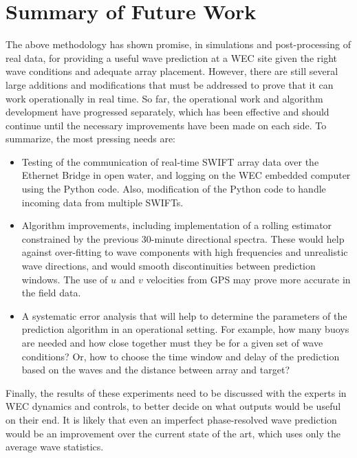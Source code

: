 \documentclass[11pt]{article}
\begin{document}
\section{Summary of Future Work}
The above methodology has shown promise, in simulations and post-processing of real data, for providing a useful wave prediction at a WEC site given the right wave conditions and adequate array placement.  However, there are still several large additions and modifications that must be addressed to prove that it can work operationally in real time.  So far, the operational work and algorithm development have progressed separately, which has been effective and should continue until the necessary improvements have been made on each side.  To summarize, the most pressing needs are:
\begin{itemize}
\item{Testing of the communication of real-time SWIFT array data over the Ethernet Bridge in open water, and logging on the WEC embedded computer using the Python code.  Also, modification of the Python code to handle incoming data from multiple SWIFTs.}
\item{Algorithm improvements, including implementation of a rolling estimator constrained by the previous 30-minute directional spectra.  These would help against over-fitting to wave components with high frequencies and unrealistic wave directions, and would smooth discontinuities between prediction windows.  The use of $u$ and $v$ velocities from GPS may prove more accurate in the field data}.
\item{A systematic error analysis that will help to determine the parameters of the prediction algorithm in an operational setting.  For example, how many buoys are needed and how close together must they be for a given set of wave conditions?  Or, how to choose the time window and delay of the prediction based on the waves and the distance between array and target?}
\end{itemize}
Finally, the results of these experiments need to be discussed with the experts in WEC dynamics and controls, to better decide on what outputs would be useful on their end.  It is likely that even an imperfect phase-resolved wave prediction would be an improvement over the current state of the art, which uses only the average wave statistics.


\end{document}
